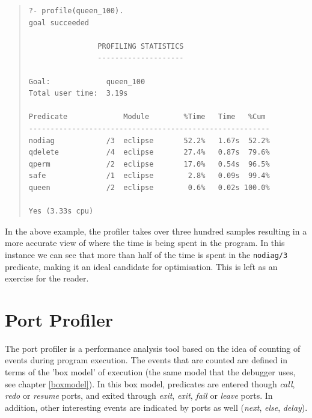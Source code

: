 \begin{quote}\begin{verbatim}
?- profile(queen_100).
goal succeeded

                PROFILING STATISTICS
                --------------------

Goal:             queen_100
Total user time:  3.19s

Predicate             Module        %Time   Time   %Cum
--------------------------------------------------------
nodiag            /3  eclipse       52.2%   1.67s  52.2%
qdelete           /4  eclipse       27.4%   0.87s  79.6%
qperm             /2  eclipse       17.0%   0.54s  96.5%
safe              /1  eclipse        2.8%   0.09s  99.4%
queen             /2  eclipse        0.6%   0.02s 100.0%

Yes (3.33s cpu)
\end{verbatim}\end{quote}

In the above example, the profiler takes over three hundred samples
resulting in a more accurate view of where the time is being spent in
the program.  In this instance we can see that more than half of the
time is spent in the \verb+nodiag/3+ predicate, making it an ideal
candidate for optimisation.  This is left as an exercise for the
reader.


\section{Port Profiler}
The port profiler is a performance analysis tool based on the idea of
counting of events during program execution.  The events that are
counted are defined in terms of the 'box model' of execution (the same
model that the debugger uses, see chapter \ref{boxmodel}).  In this
box model, predicates are entered though {\em call}, {\em redo} or {\em resume} ports,
and exited through {\em exit}, {\em *exit}, {\em fail} or {\em leave} ports.  In addition, other
interesting events are indicated by ports as well ({\em next}, {\em else}, {\em delay}). 

